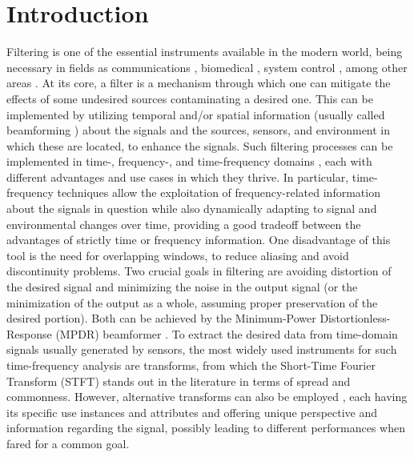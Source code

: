 \section{Introduction}
\label{sec:introduction}

Filtering is one of the essential instruments available in the modern world, being necessary in fields as communications \cite{chen_source_2002}, biomedical \cite{lobato_worst-case-optimization_2020,lu_biomedical_1994,nguyen_minimum_2017}, system control \cite{han_comparative_2016, hagglund_signal_2012}, among other areas \cite{hathcock,lee,shi}. At its core, a filter is a mechanism through which one can mitigate the effects of some undesired sources contaminating a desired one. This can be implemented by utilizing temporal and/or spatial information (usually called beamforming \cite{?}) about the signals and the sources, sensors, and environment in which these are located, to enhance the signals. Such filtering processes can be implemented in time-, frequency-, and time-frequency domains \cite{benesty_fundamentals_2017}, each with different advantages and use cases in which they thrive. In particular, time-frequency techniques allow the exploitation of frequency-related information about the signals in question while also dynamically adapting to signal and environmental changes over time, providing a good tradeoff between the advantages of strictly time or frequency information. One disadvantage of this tool is the need for overlapping windows, to reduce aliasing and avoid discontinuity problems. Two crucial goals in filtering are avoiding distortion of the desired signal and minimizing the noise in the output signal (or the minimization of the output as a whole, assuming proper preservation of the desired portion). Both can be achieved by the Minimum-Power Distortionless-Response (MPDR) beamformer \cite{capon_high-resolution_1969,erdogan_improved_2016}. To extract the desired data from time-domain signals usually generated by sensors, the most widely used instruments for such time-frequency analysis are transforms, from which the Short-Time Fourier Transform (STFT) \cite{kiymik_comparison_2005,pan_microphone_2021} stands out in the literature in terms of spread and commonness. However, alternative transforms can also be employed \cite{chen_wavelet-based_2018,yang_general_2014,almeida_fractional_1994}, each having its specific use instances and attributes and offering unique perspective and information regarding the signal, possibly leading to different performances when fared for a common goal.

